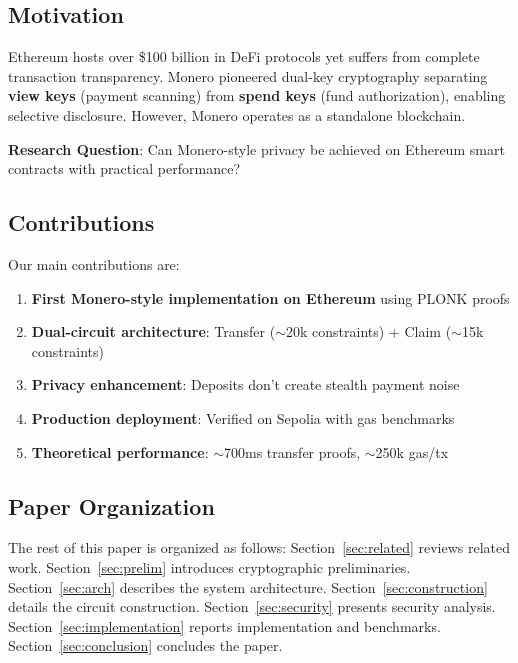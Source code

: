 \documentclass[conference]{IEEEtran}
\begin{document}
\subsection{Motivation}

Ethereum hosts over \$100 billion in DeFi protocols yet suffers from complete transaction transparency. Monero pioneered dual-key cryptography separating \textbf{view keys} (payment scanning) from \textbf{spend keys} (fund authorization), enabling selective disclosure. However, Monero operates as a standalone blockchain.

\textbf{Research Question}: Can Monero-style privacy be achieved on Ethereum smart contracts with practical performance?

\subsection{Contributions}

Our main contributions are:

\begin{enumerate}
    \item \textbf{First Monero-style implementation on Ethereum} using PLONK proofs
    \item \textbf{Dual-circuit architecture}: Transfer ($\sim$20k constraints) + Claim ($\sim$15k constraints)
    \item \textbf{Privacy enhancement}: Deposits don't create stealth payment noise
    \item \textbf{Production deployment}: Verified on Sepolia with gas benchmarks
    \item \textbf{Theoretical performance}: $\sim$700ms transfer proofs, $\sim$250k gas/tx
\end{enumerate}

\subsection{Paper Organization}

The rest of this paper is organized as follows: Section~\ref{sec:related} reviews related work. Section~\ref{sec:prelim} introduces cryptographic preliminaries. Section~\ref{sec:arch} describes the system architecture. Section~\ref{sec:construction} details the circuit construction. Section~\ref{sec:security} presents security analysis. Section~\ref{sec:implementation} reports implementation and benchmarks. Section~\ref{sec:conclusion} concludes the paper.

% 
% 
\end{document}
